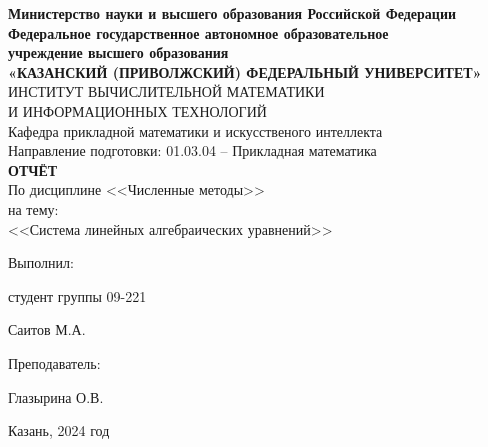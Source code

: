 \documentclass[a4paper,12pt]{article}
\begin{document}
\begin{center}
\hfill \break
\textbf{\large{Министерство науки и высшего образования Российской Федерации\\
Федеральное государственное автономное образовательное\\
учреждение высшего образования}}
\\
\large{\textbf{«КАЗАНСКИЙ (ПРИВОЛЖСКИЙ) ФЕДЕРАЛЬНЫЙ УНИВЕРСИТЕТ»}}\\
\hfill \break
\large{ИНСТИТУТ ВЫЧИСЛИТЕЛЬНОЙ МАТЕМАТИКИ\\ И ИНФОРМАЦИОННЫХ ТЕХНОЛОГИЙ}\\
 \hfill \break
\large{Кафедра прикладной математики и искусственого интеллекта}\\
\hfill\break
\hfill \break
\large{Направление подготовки: 01.03.04 – Прикладная математика}\\
\hfill \break
\hfill \break
\textbf{\large{ОТЧЁТ}}\\
\large{По дисциплине <<Численные методы>>}\\
\large{на тему:}\\
\large{<<Система линейных алгебраических уравнений>>}\\
\hfill \break
\hfill \break
\end{center}

\hfill \break
\begin{flushright}
			
    \large{Выполнил:}
    
    \large{студент группы 09-221}
    
    \large{Саитов М.А.}
    
    \large{Преподаватель:}
    
    \large{Глазырина О.В.}
    
\end{flushright}
\vfill
\begin{center} \large{Казань, 2024 год} \end{center}
\thispagestyle{empty}
 
\end{document}
